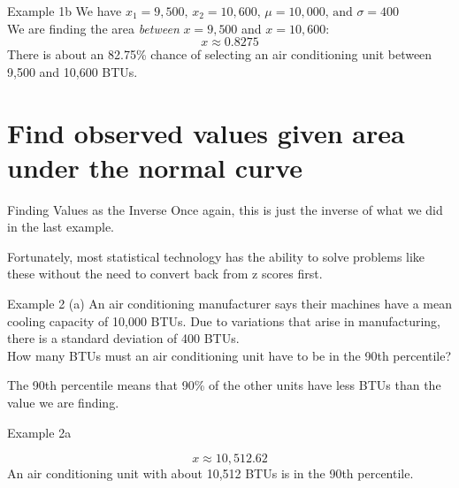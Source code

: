 \documentclass[t]{beamer}
\begin{document}
\begin{frame}{Example 1b}
We have $x_1 = 9,500, \, x_2 = 10,600, \, \mu = 10,000, \, \text{and } \sigma = 400$	\newline\\	\pause
We are finding the area \emph{between} $x = 9,500$ and $x = 10,600$:	\pause
\[x \approx 0.8275\]	\pause
There is about an 82.75\% chance of selecting an air conditioning unit between 9,500 and 10,600 BTUs.
\end{frame}

\section{Find observed values given area under the normal curve}

\begin{frame}{Finding Values as the Inverse}
Once again, this is just the inverse of what we did in the last example.	\newline\\	\pause

Fortunately, most statistical technology has the ability to solve problems like these without the need to convert back from z scores first.
\end{frame}

\begin{frame}{Example 2}
(a) \quad An air conditioning manufacturer says their machines have a mean cooling capacity of 10,000 BTUs. Due to variations that arise in manufacturing, there is a standard deviation of 400 BTUs. 	\newline\\ How many BTUs must an air conditioning unit have to be in the 90th percentile?	\newline\\	\pause

The 90th percentile means that 90\% of the other units have less BTUs than the value we are finding.	
\end{frame}

\begin{frame}{Example 2a}
\begin{center}
\end{center}
\pause
\[x \approx 10,512.62\]	\pause
An air conditioning unit with about 10,512 BTUs is in the 90th percentile.
\end{frame}
\end{document}
